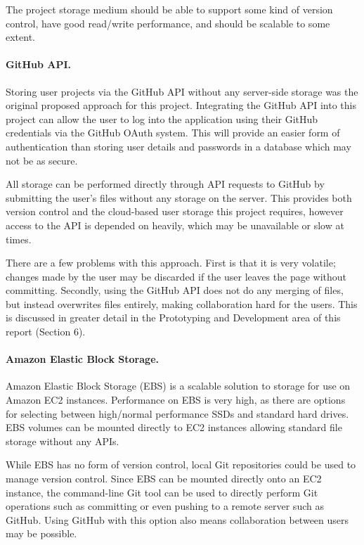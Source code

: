\documentclass[a4paper, 12pt]{article}
\begin{document}
The project storage medium should be able to support some kind of version control, have good read/write performance, and should be scalable to some extent.

\paragraph{GitHub API.}
Storing user projects via the GitHub API without any server-side storage was the original proposed approach for this project.\cite{githubapi} Integrating the GitHub API into this project can allow the user to log into the application using their GitHub credentials via the GitHub OAuth system. \cite{githuboauth} This will provide an easier form of authentication than storing user details and passwords in a database which may not be as secure.

All storage can be performed directly through API requests to GitHub by submitting the user's files without any storage on the server.\cite{githubapicommit} This provides both version control and the cloud-based user storage this project requires, however access to the API is depended on heavily, which may be unavailable or slow at times.

There are a few problems with this approach. First is that it is very volatile; changes made by the user may be discarded if the user leaves the page without committing. Secondly, using the GitHub API does not do any merging of files, but instead overwrites files entirely, making collaboration hard for the users. This is discussed in greater detail in the Prototyping and Development area of this report (Section 6).

\paragraph{Amazon Elastic Block Storage.}
Amazon Elastic Block Storage (EBS) is a scalable solution to storage for use on Amazon EC2 instances. Performance on EBS is very high, as there are options for selecting between high/normal performance SSDs and standard hard drives. EBS volumes can be mounted directly to EC2 instances allowing standard file storage without any APIs.\cite{awsebs}

While EBS has no form of version control, local Git repositories could be used to manage version control. Since EBS can be mounted directly onto an EC2 instance, the command-line Git tool can be used to directly perform Git operations such as committing or even pushing to a remote server such as GitHub. Using GitHub with this option also means collaboration between users may be possible.
\end{document}
